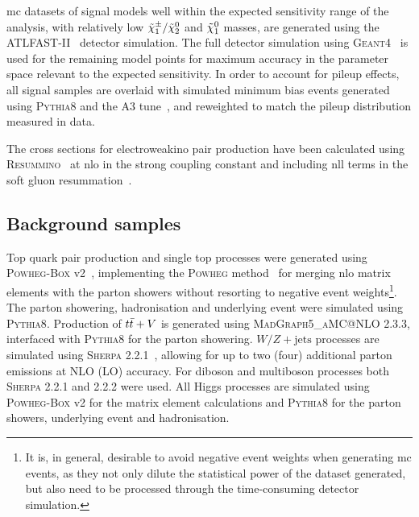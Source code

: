 \gls{mc} datasets of signal models well within the expected sensitivity range of the analysis, \ie with relatively low $\tilde{\chi}_1^\pm/\tilde{\chi}_2^0$ and $\tilde{\chi}_1^0$ masses, are generated using the \textsc{ATLFAST-II}~\cite{Aad:2010ah} detector simulation. The full detector simulation using \textsc{Geant4}~\cite{geant:2002hh} is used for the remaining model points for maximum accuracy in the parameter space relevant to the expected sensitivity. In order to account for pileup effects, all signal samples are overlaid with simulated minimum bias events generated using \textsc{Pythia8} and the A3 tune~\cite{ATL-PHYS-PUB-2016-017}, and reweighted to match the pileup distribution measured in data. 

The cross sections for electroweakino pair production have been calculated using \mbox{\textsc{Resummino}}~\cite{Fuks:2013vua} at \gls{nlo} in the strong coupling constant and including \gls{nll} terms in the soft gluon resummation~\cite{Fiaschi:2018hgm,Fuks:2012qx}.

\subsection{Background samples}

Top quark pair production and single top processes were generated using \textsc{Powheg-Box} v2~\cite{PowhegBox:2010xd}, implementing the \textsc{Powheg} method~\cite{Powheg1,Powheg2} for merging \gls{nlo} matrix elements with the parton showers without resorting to negative event weights\footnote{It is, in general, desirable to avoid negative event weights when generating \gls{mc} events, as they not only dilute the statistical power of the dataset generated, but also need to be processed through the time-consuming detector simulation.}.
The parton showering, hadronisation and underlying event were simulated using \textsc{Pythia8}. Production of $t\bar{t}+V$ is generated using \textsc{MadGraph5\_aMC@NLO} 2.3.3, interfaced with \textsc{Pythia8} for the parton showering. 
$W/Z+\mathrm{jets}$ processes are simulated using \textsc{Sherpa} 2.2.1~\cite{Gleisberg:2008ta,Bothmann:2019yzt}, allowing for up to two (four) additional parton emissions at NLO (LO) accuracy. 
For diboson and multiboson  processes both \textsc{Sherpa} 2.2.1 and 2.2.2 were used. 
All Higgs processes are simulated using \textsc{Powheg-Box} v2 for the matrix element calculations and \textsc{Pythia8} for the parton showers, underlying event and hadronisation. 

